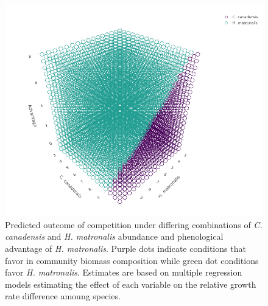 \documentclass{article}\usepackage[]{graphicx}\usepackage[]{color}
\begin{document}
{\begin{figure}[h!]
    \centering
\includegraphics[width=\textwidth]{..//figure/3dconnolly2.png}
   \caption{Predicted outcome of competition under differing combinations of \textit{C. canadensis} and \textit{H. matronalis} abundance and phenological advantage of \textit{H. matronalis}. Purple dots indicate conditions that favor   in community biomass composition while green dot conditions favor \textit{H. matronalis}. Estimates are based on multiple regression models estimating the effect of each variable on the relative growth rate difference amoung species.} 
   \label{fig:3D}
\end{figure}

}
\end{document}
